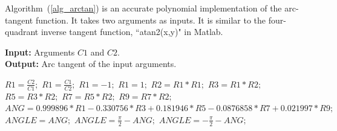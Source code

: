 \documentclass[journal]{IEEEtran}
\DeclarePairedDelimiter{\abs}{\lvert}{\rvert}
\begin{document}
%
Algorithm~(\ref{alg_arctan}) is an accurate polynomial implementation of the arc-tangent function. It takes two arguments as inputs. It is similar to the four-quadrant inverse tangent function, ``atan2(x,y)" in Matlab.

\begin{algorithm}[h]
\caption{Efficient computation of $\arctan(C1, C2)$}
 \hspace*{\algorithmicindent} \textbf{Input:} Arguments $C1$ and $C2$. \\
 \hspace*{\algorithmicindent} \textbf{Output:} Arc tangent of the input arguments. 
\begin{algorithmic}[1]
  \State $R1 =\frac{C2}{C1};$
\Else
\State $R1 =\frac{C1}{C2};$
\EndIf
{}
  \State $R1 =-1;$
\EndIf
{}
  \State $R1 =1;$
\EndIf
\State $R2 = R1 * R1;$
\State $R3 = R1 * R2;$
\State $R5 = R3 * R2;$
\State $R7 = R5 * R2;$
\State $R9 = R7 * R2;$
\State $ANG = 0.999896 * R1 - 0.330756 * R3 + 0.181946 * R5 - 0.0876858 * R7 + 0.021997 * R9;$
  \State $ANGLE = ANG;$
\Else
    \State $ANGLE =  \frac{\pi}{2} - ANG;$
    \EndIf
    \State $ANGLE = - \frac{\pi}{2} - ANG;$
    \EndIf
\EndIf
\end{algorithmic}
\label{alg_arctan}
\end{algorithm}



\end{document}
